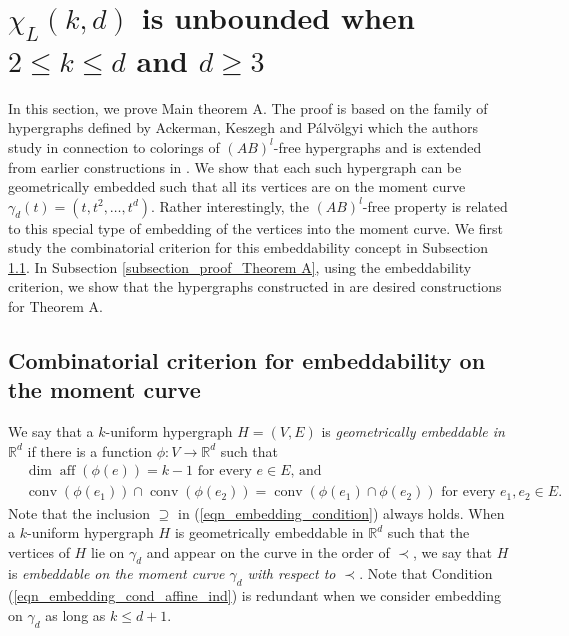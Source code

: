 \documentclass{article}
\newcommand{\RR}{\mathbb{R}}
\theoremstyle{definition}
\DeclareMathOperator{\conv}{conv}
\DeclareMathOperator{\aff}{aff}
\begin{document}
\section{\texorpdfstring{$\chi_L(k,d)$}{XL(k,d)} is unbounded when \texorpdfstring{$2 \leq k \leq d$}{2<=k<=d} and \texorpdfstring{$d\geq 3$}{d>=3}} \label{section_codimension>=1}
In this section, we prove Main theorem A. The proof is based on the family of hypergraphs defined by Ackerman, Keszegh and P\'alv\"olgyi \cite{ABAB_stabbed_pseudodisk} which the authors study 
in connection to colorings of $(AB)^l$-free hypergraphs and is extended from earlier constructions in \cite{ABABA_construction_pach, abstract_polychromatic}. We show that each such hypergraph can be geometrically embedded such that all its vertices are on the moment curve $\gamma_d(t)=(t, t^2, \dots, t^d)$. Rather interestingly, the $(AB)^l$-free property is related to this special type of embedding of the vertices into the moment curve. We first study the combinatorial criterion  for this embeddability concept in Subsection \ref{subsection_moment_curve}. In Subsection \ref{subsection_proof_Theorem A}, using the embeddability criterion, we show that the hypergraphs constructed in \cite{ABAB_stabbed_pseudodisk} are desired constructions for Theorem A.

\subsection{Combinatorial criterion for embeddability on the moment curve}
\label{subsection_moment_curve}

We say that a $k$-uniform hypergraph $H=(V,E)$ is \textit{geometrically embeddable in $\RR^d$} if there is a function $\phi:V\to \RR^d$ such that 
\begin{align}
&\dim \aff(\phi(e)) = k-1 \textrm{ for every $e\in E$, and} \label{eqn_embedding_cond_affine_ind}\\
&\conv(\phi(e_1)) \cap \conv(\phi(e_2))=\conv(\phi(e_1)\cap \phi(e_2)) \textrm{ for every $e_1, e_2 \in E$}. \label{eqn_embedding_condition}
\end{align}
Note that the inclusion $\supseteq$ in (\ref{eqn_embedding_condition}) always holds. When a $k$-uniform hypergraph $H$ is geometrically embeddable in $\RR^d$ such that the vertices of $H$ lie on $\gamma_d$ and appear on the curve in the order of $\prec$, we say that $H$ is \textit{embeddable on the moment curve $\gamma_d$ with respect to $\prec$}. 
Note that Condition (\ref{eqn_embedding_cond_affine_ind}) is redundant when we consider embedding on $\gamma_d$ as long as $k\leq d+1$.
\end{document}
